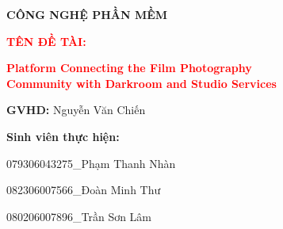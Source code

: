 \begin{titlepage}
\begin{center}
		\vspace{0.15cm}
		
		{\Large\bfseries
			CÔNG NGHỆ PHẦN MỀM
		}
		
	\end{center}
	
	\begin{center}
	\vspace{1.25cm}
	
	\noindent
	{\large\bfseries\textcolor{red}{TÊN ĐỀ TÀI: }}
	
		\vspace{0.35cm}
	
		
	\noindent
	{\Large\bfseries\textcolor{red}{
			Platform Connecting the Film Photography
				\vspace{0.30cm}
			\\Community with Darkroom and Studio Services
	}}
	
	
	\vspace{1.7cm}



\vspace{1.4cm}

\noindent
\hfill
\begin{minipage}[t]{10cm}
	
	{\Large\bfseries GVHD: }{\Large Nguyễn Văn Chiến}
	
	\vspace{0.35cm}
	
	{\Large\bfseries Sinh viên thực hiện:}
	
	\vspace{0.30cm}
	
	{\Large 079306043275\_Phạm Thanh Nhàn}
	
	\vspace{0.30cm}
	
	{\Large 082306007566\_Đoàn Minh Thư}
	
	\vspace{0.30cm}
	
	{\Large 080206007896\_Trần Sơn Lâm}
	

\end{minipage}
\end{center}
\end{titlepage}
